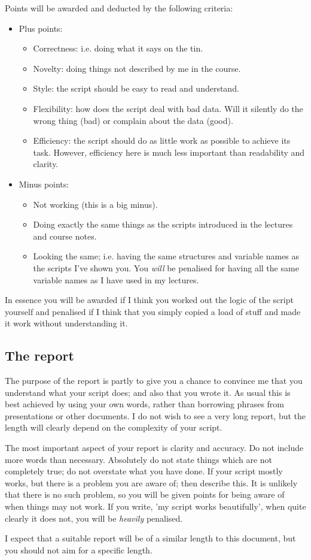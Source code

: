 \documentclass[11pt]{article}
\begin{document}
Points will be awarded and deducted by the following criteria:
\begin{itemize}
\item Plus points:
  \begin{itemize}
  \item Correctness: i.e. doing what it says on the tin.
  \item Novelty: doing things not described by me in the course.
  \item Style: the script should be easy to read and understand.
  \item Flexibility: how does the script deal with bad data. Will it silently do
    the wrong thing (bad) or complain about the data (good).
  \item Efficiency: the script should do as little work as possible to achieve
    its task. However, efficiency here is much less important than readability
    and clarity.
  \end{itemize}
\item Minus points:
  \begin{itemize} 
    \item Not working (this is a big minus).
    \item Doing exactly the same things as the scripts introduced in the
      lectures and course notes.
    \item Looking the same; i.e. having the same structures and variable
      names as the scripts I've shown you. You \emph{will} be penalised for
      having all the same variable names as I have used in my lectures.
  \end{itemize}
\end{itemize}

In essence you will be awarded if I think you worked out the logic of the
script yourself and penalised if I think that you simply copied a load of
stuff and made it work without understanding it.

\subsection{The report}

The purpose of the report is partly to give you a chance to convince me that
you understand what your script does; and also that you wrote it. As usual
this is best achieved by using your own words, rather than borrowing phrases
from presentations or other documents. I do not wish to see a very long
report, but the length will clearly depend on the complexity of your script.

The most important aspect of your report is clarity and accuracy. Do not
include more words than necessary. Absolutely do not state things which are
not completely true; do not overstate what you have done. If your script
mostly works, but there is a problem you are aware of; then describe
this. It is unlikely that there is no such problem, so you will be given
points for being aware of when things may not work. If you write, 'my script
works beautifully', when quite clearly it does not, you will be \emph{heavily}
penalised. 

I expect that a suitable report will be of a similar length to this document,
but you should not aim for a specific length.
\end{document}

